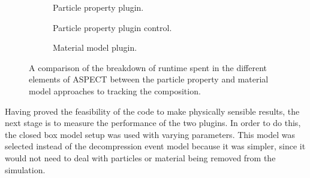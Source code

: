 \begin{figure}
    \centering
    \begin{subfigure}{\textwidth}
        \centering
        \caption{Particle property plugin.}
        \label{fig:runtime_pie_particle_property}
        \vspace{5mm}
    \end{subfigure}
    \begin{subfigure}{\textwidth}
        \centering
        \caption{Particle property plugin control.}
        \label{fig:runtime_pie_particle_property_ctrl}
        \vspace{5mm}
    \end{subfigure}
    \begin{subfigure}{\textwidth}
        \centering
        \caption{Material model plugin.}
        \label{fig:runtime_pie_material_model}
    \end{subfigure}
    \caption{
        A comparison of the breakdown of runtime spent in the different elements of ASPECT between the particle property and material model approaches to tracking the composition.
    }
    \label{fig:runtime_pie}
\end{figure}

Having proved the feasibility of the code to make physically sensible results, the next stage is to measure the performance of the two plugins.
In order to do this, the closed box model setup was used with varying parameters.
This model was selected instead of the decompression event model because it was simpler, since it would not need to deal with particles or material being removed from the simulation.

